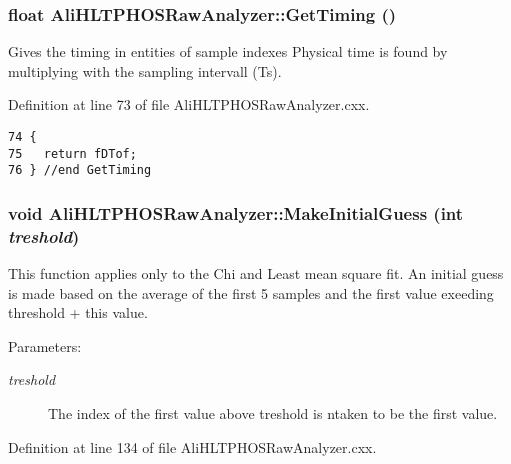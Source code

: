 \subsubsection{\setlength{\rightskip}{0pt plus 5cm}float Ali\-HLTPHOSRaw\-Analyzer::Get\-Timing ()\hspace{0.3cm}{\tt  [inherited]}}\label{classAliHLTPHOSRawAnalyzer_AliHLTPHOSRawAnalyzerPeakFindera10}


Gives the timing in entities of sample indexes Physical time is found by multiplying with the sampling intervall (Ts). 

Definition at line 73 of file Ali\-HLTPHOSRaw\-Analyzer.cxx.

\footnotesize\begin{verbatim}74 {
75   return fDTof;
76 } //end GetTiming
\end{verbatim}\normalsize 


\subsubsection{\setlength{\rightskip}{0pt plus 5cm}void Ali\-HLTPHOSRaw\-Analyzer::Make\-Initial\-Guess (int {\em treshold})\hspace{0.3cm}{\tt  [inherited]}}\label{classAliHLTPHOSRawAnalyzer_AliHLTPHOSRawAnalyzerPeakFindera15}


This function applies only to the Chi and Least mean square fit. An initial guess is made based on the average of the first 5 samples and the first value exeeding threshold + this value. \begin{Desc}
\item[Parameters:]
\begin{description}
\item[{\em treshold}]The index of the first value above treshold is ntaken to be the first value. \end{description}
\end{Desc}


Definition at line 134 of file Ali\-HLTPHOSRaw\-Analyzer.cxx.

